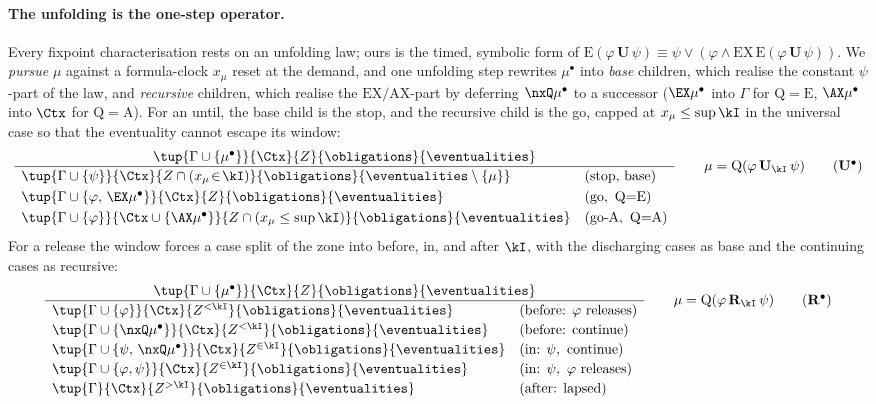\paragraph{The unfolding is the one-step operator.}
Every fixpoint characterisation rests on an unfolding law; ours is the timed, symbolic form of
$\mathrm{E}(\varphi\,\mathbf{U}\,\psi)\equiv \psi\vee(\varphi\wedge \mathrm{EX}\,\mathrm{E}(\varphi\,\mathbf{U}\,\psi))$.
We \emph{pursue} $\mu$ against a formula-clock $x_\mu$ reset at the demand, and one unfolding step rewrites
$\mu^\bullet$ into \emph{base} children, which realise the constant $\psi$-part of the law, and
\emph{recursive} children, which realise the $\mathrm{EX}/\mathrm{AX}$-part by deferring $\nxQ\mu^\bullet$ to
a successor ($\EX\mu^\bullet$ into $\Gamma$ for $\mathrm{Q}=\mathrm{E}$, $\AX\mu^\bullet$ into $\Ctx$ for
$\mathrm{Q}=\mathrm{A}$). For an until, the base child is the stop, and the recursive child is the go, capped
at $x_\mu\le\sup\kI$ in the universal case so that the eventuality cannot escape its window:
\[
\frac{\tup{\Gamma\cup\{\mu^\bullet\}}{\Ctx}{Z}{\obligations}{\eventualities}}
{\begin{array}{ll}
\tup{\Gamma\cup\{\psi\}}{\Ctx}{Z\cap(x_\mu\!\in\!\kI)}{\obligations}{\eventualities\setminus\{\mu\}} & (\text{stop, base})\\[3pt]
\tup{\Gamma\cup\{\varphi,\,\EX\mu^\bullet\}}{\Ctx}{Z}{\obligations}{\eventualities} & (\text{go},\ \mathrm{Q}{=}\mathrm{E})\\[3pt]
\tup{\Gamma\cup\{\varphi\}}{\Ctx\cup\{\AX\mu^\bullet\}}{Z\cap(x_\mu\le\sup\kI)}{\obligations}{\eventualities} & (\text{go-A},\ \mathrm{Q}{=}\mathrm{A})
\end{array}}
\qquad \mu=\mathrm{Q}(\varphi\,\mathbf{U}_\kI\,\psi)
\tag{$\mathbf{U}^\bullet$}\label{tag:Uunf}
\]
For a release the window forces a case split of the zone into before, in, and after $\kI$, with the
discharging cases as base and the continuing cases as recursive:
\[
\frac{\tup{\Gamma\cup\{\mu^\bullet\}}{\Ctx}{Z}{\obligations}{\eventualities}}
{\begin{array}{ll}
\tup{\Gamma\cup\{\varphi\}}{\Ctx}{Z^{<\kI}}{\obligations}{\eventualities} & (\text{before: }\varphi\text{ releases})\\[2pt]
\tup{\Gamma\cup\{\nxQ\mu^\bullet\}}{\Ctx}{Z^{<\kI}}{\obligations}{\eventualities} & (\text{before: continue})\\[2pt]
\tup{\Gamma\cup\{\psi,\,\nxQ\mu^\bullet\}}{\Ctx}{Z^{\in\kI}}{\obligations}{\eventualities} & (\text{in: }\psi,\text{ continue})\\[2pt]
\tup{\Gamma\cup\{\varphi,\psi\}}{\Ctx}{Z^{\in\kI}}{\obligations}{\eventualities} & (\text{in: }\psi,\ \varphi\text{ releases})\\[2pt]
\tup{\Gamma}{\Ctx}{Z^{>\kI}}{\obligations}{\eventualities} & (\text{after: lapsed})
\end{array}}
\qquad \mu=\mathrm{Q}(\varphi\,\mathbf{R}_\kI\,\psi)
\tag{$\mathbf{R}^\bullet$}\label{tag:Runf}
\]
